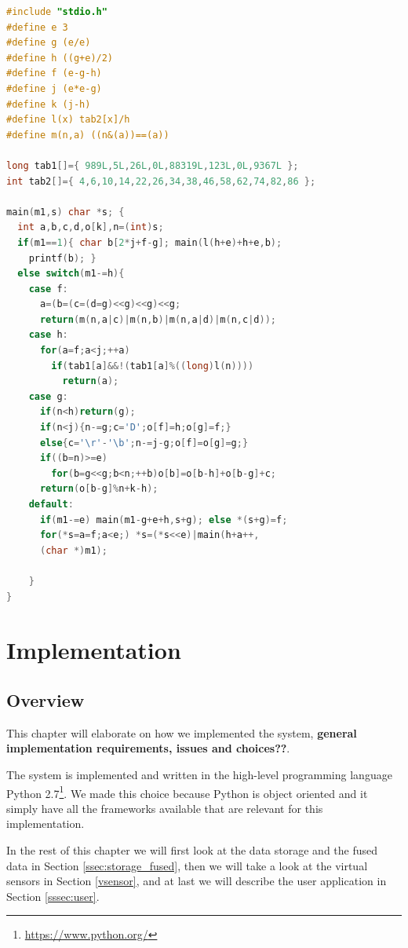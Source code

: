 \documentclass[USenglish]{uit-thesis}
\begin{document}
\begin{lstlisting}[frame=single,caption={Small C program},language=C]
#include "stdio.h"
#define e 3
#define g (e/e)
#define h ((g+e)/2)
#define f (e-g-h)
#define j (e*e-g)
#define k (j-h)
#define l(x) tab2[x]/h
#define m(n,a) ((n&(a))==(a))

long tab1[]={ 989L,5L,26L,0L,88319L,123L,0L,9367L };
int tab2[]={ 4,6,10,14,22,26,34,38,46,58,62,74,82,86 };

main(m1,s) char *s; {
  int a,b,c,d,o[k],n=(int)s;
  if(m1==1){ char b[2*j+f-g]; main(l(h+e)+h+e,b);
    printf(b); }
  else switch(m1-=h){
    case f:
      a=(b=(c=(d=g)<<g)<<g)<<g;
      return(m(n,a|c)|m(n,b)|m(n,a|d)|m(n,c|d));
    case h:
      for(a=f;a<j;++a)
        if(tab1[a]&&!(tab1[a]%((long)l(n))))
          return(a);
    case g:
      if(n<h)return(g);
      if(n<j){n-=g;c='D';o[f]=h;o[g]=f;}
      else{c='\r'-'\b';n-=j-g;o[f]=o[g]=g;}
      if((b=n)>=e)
        for(b=g<<g;b<n;++b)o[b]=o[b-h]+o[b-g]+c;
      return(o[b-g]%n+k-h);
    default:
      if(m1-=e) main(m1-g+e+h,s+g); else *(s+g)=f;
      for(*s=a=f;a<e;) *s=(*s<<e)|main(h+a++,
      (char *)m1);

    }
}
\end{lstlisting}
\fi

\chapter{Implementation}

\section{Overview}
This chapter will elaborate on how we implemented the system, \textbf{general implementation requirements, issues and choices??}.

The system is implemented and written in the high-level programming language Python 2.7\footnote{\url{https://www.python.org/}}. We made this choice because Python is object oriented and it simply have all the frameworks available that are relevant for this implementation. %


In the rest of this chapter we will first look at the data storage and the fused data in Section \ref{ssec:storage_fused}, then we will take a look at the virtual sensors in Section \ref{vsensor}, and at last we will describe the user application in Section \ref{sssec:user}.
\end{document}
